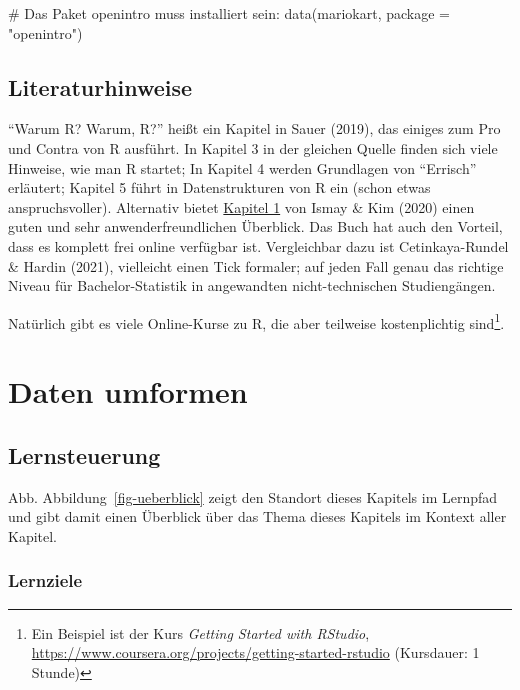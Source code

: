 \documentclass[
  letterpaper,
]{scrbook}
\newenvironment{Shaded}{\begin{snugshade}}{\end{snugshade}}
\newcommand{\AttributeTok}[1]{\textcolor[rgb]{0.40,0.45,0.13}{#1}}
\newcommand{\CommentTok}[1]{\textcolor[rgb]{0.37,0.37,0.37}{#1}}
\newcommand{\FunctionTok}[1]{\textcolor[rgb]{0.28,0.35,0.67}{#1}}
\newcommand{\NormalTok}[1]{\textcolor[rgb]{0.00,0.23,0.31}{#1}}
\newcommand{\StringTok}[1]{\textcolor[rgb]{0.13,0.47,0.30}{#1}}
\theoremstyle{definition}
\theoremstyle{definition}
\theoremstyle{definition}
\theoremstyle{remark}
\begin{document}
\begin{Shaded}
\begin{Highlighting}[]
\CommentTok{\# Das Paket \textquotesingle{}openintro\textquotesingle{} muss installiert sein:}
\FunctionTok{data}\NormalTok{(mariokart, }\AttributeTok{package =} \StringTok{"openintro"}\NormalTok{) }
\end{Highlighting}
\end{Shaded}

\section{Literaturhinweise}\label{literaturhinweise-1}

``Warum R? Warum, R?'' heißt ein Kapitel in Sauer (2019), das einiges
zum Pro und Contra von R ausführt. In Kapitel 3 in der gleichen Quelle
finden sich viele Hinweise, wie man R startet; In Kapitel 4 werden
Grundlagen von ``Errisch'' erläutert; Kapitel 5 führt in Datenstrukturen
von R ein (schon etwas anspruchsvoller). Alternativ bietet
\href{https://moderndive.com/1-getting-started.html}{Kapitel 1} von
Ismay \& Kim (2020) einen guten und sehr anwenderfreundlichen Überblick.
Das Buch hat auch den Vorteil, dass es komplett frei online verfügbar
ist. Vergleichbar dazu ist Cetinkaya-Rundel \& Hardin (2021), vielleicht
einen Tick formaler; auf jeden Fall genau das richtige Niveau für
Bachelor-Statistik in angewandten nicht-technischen Studiengängen.

Natürlich gibt es viele Online-Kurse zu R, die aber teilweise
kostenplichtig sind\footnote{Ein Beispiel ist der Kurs \emph{Getting
  Started with RStudio},
  \url{https://www.coursera.org/projects/getting-started-rstudio}
  (Kursdauer: 1 Stunde)}.

\chapter{Daten umformen}\label{daten-umformen}

\section{Lernsteuerung}\label{lernsteuerung-2}

Abb. Abbildung~\ref{fig-ueberblick} zeigt den Standort dieses Kapitels
im Lernpfad und gibt damit einen Überblick über das Thema dieses
Kapitels im Kontext aller Kapitel.

\subsection{Lernziele}\label{lernziele-3}
\end{document}
